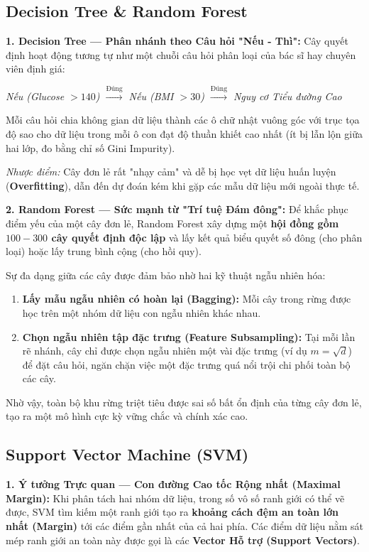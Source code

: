 \documentclass[12pt,a4paper]{report}
\begin{document}
\subsection{Decision Tree \& Random Forest}
\textbf{1. Decision Tree — Phân nhánh theo Câu hỏi "Nếu - Thì":}
Cây quyết định hoạt động tương tự như một chuỗi câu hỏi phân loại của bác sĩ hay chuyên viên định giá:
\begin{center}
\small
\textit{Nếu (Glucose $> 140$) $\xrightarrow{\text{Đúng}}$ Nếu (BMI $> 30$) $\xrightarrow{\text{Đúng}}$ Nguy cơ Tiểu đường Cao}
\end{center}
Mỗi câu hỏi chia không gian dữ liệu thành các ô chữ nhật vuông góc với trục tọa độ sao cho dữ liệu trong mỗi ô con đạt độ thuần khiết cao nhất (ít bị lẫn lộn giữa hai lớp, đo bằng chỉ số Gini Impurity).

\textit{Nhược điểm:} Cây đơn lẻ rất "nhạy cảm" và dễ bị học vẹt dữ liệu huấn luyện (\textbf{Overfitting}), dẫn đến dự đoán kém khi gặp các mẫu dữ liệu mới ngoài thực tế.

\textbf{2. Random Forest — Sức mạnh từ "Trí tuệ Đám đông":}
Để khắc phục điểm yếu của một cây đơn lẻ, Random Forest xây dựng một \textbf{hội đồng gồm $100 - 300$ cây quyết định độc lập} và lấy kết quả biểu quyết số đông (cho phân loại) hoặc lấy trung bình cộng (cho hồi quy).

Sự đa dạng giữa các cây được đảm bảo nhờ hai kỹ thuật ngẫu nhiên hóa:
\begin{enumerate}[leftmargin=1.5em]
    \item \textbf{Lấy mẫu ngẫu nhiên có hoàn lại (Bagging):} Mỗi cây trong rừng được học trên một nhóm dữ liệu con ngẫu nhiên khác nhau.
    \item \textbf{Chọn ngẫu nhiên tập đặc trưng (Feature Subsampling):} Tại mỗi lần rẽ nhánh, cây chỉ được chọn ngẫu nhiên một vài đặc trưng (ví dụ $m = \sqrt{d}$) để đặt câu hỏi, ngăn chặn việc một đặc trưng quá nổi trội chi phối toàn bộ các cây.
\end{enumerate}
Nhờ vậy, toàn bộ khu rừng triệt tiêu được sai số bất ổn định của từng cây đơn lẻ, tạo ra một mô hình cực kỳ vững chắc và chính xác cao.

\subsection{Support Vector Machine (SVM)}
\textbf{1. Ý tưởng Trực quan — Con đường Cao tốc Rộng nhất (Maximal Margin):}
Khi phân tách hai nhóm dữ liệu, trong số vô số ranh giới có thể vẽ được, SVM tìm kiếm một ranh giới tạo ra \textbf{khoảng cách đệm an toàn lớn nhất (Margin)} tới các điểm gần nhất của cả hai phía. Các điểm dữ liệu nằm sát mép ranh giới an toàn này được gọi là các \textbf{Vector Hỗ trợ (Support Vectors)}.
\end{document}
